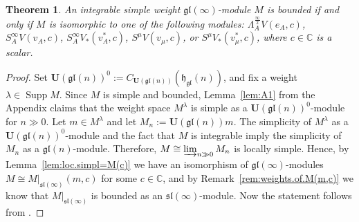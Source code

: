 \documentclass[12pt]{amsart}
\newcommand\C{\mathbb{C}}
\newcommand\fh{\mathfrak{h}}
\newcommand\fsl{\mathfrak{sl}}
\newcommand\fgl{\mathfrak{gl}}
\newcommand\bU{\mathbf{U}}
\DeclareMathOperator{\Supp}{Supp} %
\theoremstyle{plain}
\newtheorem{theo}{Theorem}[section]
\theoremstyle{definition}
\numberwithin{equation}{section}
\begin{document}
\begin{theo}\label{thm:bound.s.w.gl.mod}
An integrable simple weight $\fgl(\infty)$-module $M$ is bounded if and only if $M$ is isomorphic to one of the following modules: $\Lambda_A^{\frac{\infty}{2}} V(e_A, c)$, $S_A^{\infty} V(v_A, c)$, $S_A^{\infty} V_*(v_A^*, c)$,  $S^\mu V(v_\mu, c)$, or $S^\mu V_*(v_\mu^*, c)$, where $c\in \C$ is a scalar.
\end{theo}
\begin{proof}
Set $\bU(\fgl(n))^0 := C_{\bU(\fgl(n))}(\fh_\fgl (n))$, and fix a weight $\lambda\in \Supp M$. Since $M$ is simple and bounded, Lemma~\ref{lem:A1} from the Appendix claims that the weight space $M^\lambda$ is simple as a $\bU(\fgl(n))^0$-module for $n\gg 0$. Let $m\in M^\lambda$ and let $M_n :=\bU(\fgl(n))m$. The simplicity of $M^\lambda$ as a $\bU(\fgl(n))^0$-module and the fact that $M$ is integrable imply the simplicity of $M_n$ as a $\fgl(n)$-module. Therefore, $M\cong \varinjlim_{n\gg 0} M_n$ is locally simple. Hence, by Lemma~\ref{lem:loc.simpl=M(c)} we have an isomorphism of $\fgl(\infty)$-modules $M\cong M|_{\fsl(\infty)} (m,c)$ for some $c\in \C$, and by Remark~\ref{rem:weights.of.M(m,c)} we know that $M|_{\fsl(\infty)}$ is bounded as an $\fsl(\infty)$-module.  Now the statement follows from \cite[Theorem~5.1]{GP20}.
\end{proof}
\end{document}
